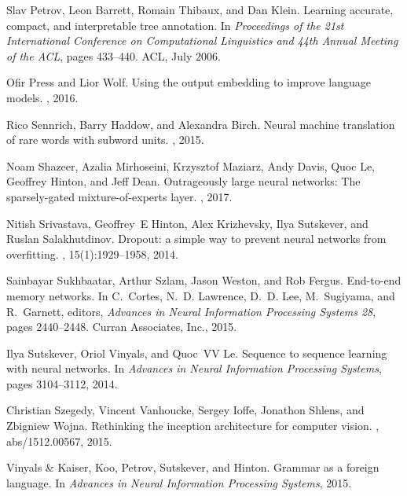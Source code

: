 \documentclass{article}
\begin{document}
\begin{thebibliography}{10}
  Slav Petrov, Leon Barrett, Romain Thibaux, and Dan Klein.
  \newblock Learning accurate, compact, and interpretable tree annotation.
  \newblock In {\em Proceedings of the 21st International Conference on
      Computational Linguistics and 44th Annual Meeting of the ACL}, pages
  433--440. ACL, July 2006.

  Ofir Press and Lior Wolf.
  \newblock Using the output embedding to improve language models.
  , 2016.

  Rico Sennrich, Barry Haddow, and Alexandra Birch.
  \newblock Neural machine translation of rare words with subword units.
  , 2015.

  Noam Shazeer, Azalia Mirhoseini, Krzysztof Maziarz, Andy Davis, Quoc Le,
  Geoffrey Hinton, and Jeff Dean.
  \newblock Outrageously large neural networks: The sparsely-gated
  mixture-of-experts layer.
  , 2017.

  Nitish Srivastava, Geoffrey~E Hinton, Alex Krizhevsky, Ilya Sutskever, and
  Ruslan Salakhutdinov.
  \newblock Dropout: a simple way to prevent neural networks from overfitting.
  , 15(1):1929--1958, 2014.

  Sainbayar Sukhbaatar, Arthur Szlam, Jason Weston, and Rob Fergus.
  \newblock End-to-end memory networks.
  \newblock In C.~Cortes, N.~D. Lawrence, D.~D. Lee, M.~Sugiyama, and R.~Garnett,
  editors, {\em Advances in Neural Information Processing Systems 28}, pages
  2440--2448. Curran Associates, Inc., 2015.

  Ilya Sutskever, Oriol Vinyals, and Quoc~VV Le.
  \newblock Sequence to sequence learning with neural networks.
  \newblock In {\em Advances in Neural Information Processing Systems}, pages
  3104--3112, 2014.

  Christian Szegedy, Vincent Vanhoucke, Sergey Ioffe, Jonathon Shlens, and
  Zbigniew Wojna.
  \newblock Rethinking the inception architecture for computer vision.
  , abs/1512.00567, 2015.

  {Vinyals {\&} Kaiser}, Koo, Petrov, Sutskever, and Hinton.
  \newblock Grammar as a foreign language.
  \newblock In {\em Advances in Neural Information Processing Systems}, 2015.


\end{thebibliography}
\end{document}
